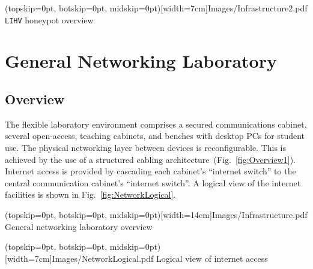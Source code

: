 \documentclass{ieeeaccess}
\begin{document}
\Figure[t!](topskip=0pt, botskip=0pt, midskip=0pt)[width=7cm]{Images/Infrastructure2.pdf}
{\texttt{LIHV} honeypot overview\label{fig:Overview2}}


\section{General Networking Laboratory}\label{sec:netlab}
\subsection{Overview}
The flexible laboratory environment comprises a secured communications cabinet,
several open-access, teaching cabinets, and benches with desktop PCs for
student use. The physical networking layer between devices is reconfigurable.
This is achieved by the use of a structured cabling
architecture~(Fig.~\ref{fig:Overview1}).  Internet access is provided by
cascading each cabinet's ``internet switch'' to the central communication
cabinet's ``internet switch''. A logical view of the internet facilities is
shown in Fig.~\ref{fig:NetworkLogical}.

\Figure[t!](topskip=0pt, botskip=0pt, midskip=0pt)[width=14cm]{Images/Infrastructure.pdf}
{General networking laboratory overview\label{fig:Overview1}}



\Figure[t!](topskip=0pt, botskip=0pt, midskip=0pt)[width=7cm]{Images/NetworkLogical.pdf}
{Logical view of internet access\label{fig:NetworkLogical}}

\end{document}
